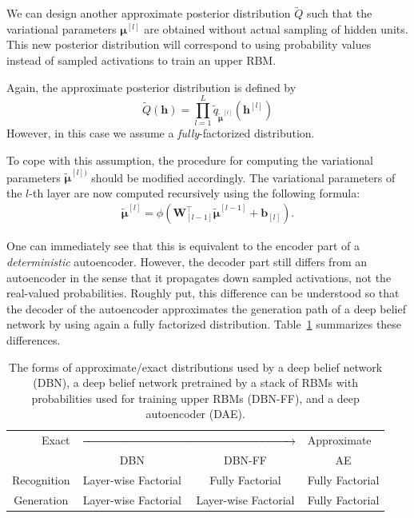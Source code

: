 \documentclass[dissertation,nocontribution,draft*]{aaltoseries}
\newcommand{\qlay}[1]{\left[#1\right]}
\newcommand{\vect}[1]{\mathbf{#1}}
\newcommand{\vects}[1]{\boldsymbol{#1}}
\newcommand{\matr}[1]{\mathbf{#1}}
\newcommand{\vb}[0]{\vect{b}}
\newcommand{\vh}[0]{\vect{h}}
\newcommand{\mW}[0]{\matr{W}}
\newcommand{\vmu}[0]{\vects{\mu}}
\begin{document}
We can design another approximate posterior distribution
$\tilde{Q}$ such that the variational parameters
$\vmu^{\qlay{l}}$ are obtained without actual sampling of hidden
units. This new posterior distribution will correspond to
using probability values instead of sampled activations to
train an upper RBM.

Again, the approximate posterior distribution is defined by
\[
\tilde{Q}(\vh) = \prod_{l=1}^L \tilde{q}_{\tilde{\vmu}^{\qlay{l}}}\left(
\vh^{\qlay{l}} \right)
\]
However, in this case we assume a \textit{fully}-factorized
distribution. 

To cope with this assumption, the procedure for computing
the variational parameters $\tilde{\vmu}^{\qlay{l})}$ should
be modified accordingly.  The variational parameters of the
$l$-th layer are now computed recursively using the
following formula: 
\begin{align}
    \label{eq:dbn_posterior_ff}
    \tilde{\vmu}^{\qlay{l}} = \phi\left( \mW_{\qlay{l-1}}^\top
    \tilde{\vmu}^{\qlay{l-1}} + \vb_{\qlay{l}} \right).
\end{align}

One can immediately see that this is equivalent to the
encoder part of a \textit{deterministic} autoencoder.
However, the decoder part still differs from an autoencoder
in the sense that it propagates down sampled activations,
not the real-valued probabilities.  Roughly put, this
difference can be understood so that the decoder of the
autoencoder approximates the generation path of a deep
belief network by using again a fully factorized distribution.
Table~\ref{tbl:dbn_ae} summarizes these differences.

\begin{table}[h]
\vskip 0.15in
    \centering
    \begin{tabular}{c || c | c | c}
        \multicolumn{1}{r}{Exact}&
        \multicolumn{2}{c}{$\xrightarrow{\hspace{6.5cm}}$} 
        & \multicolumn{1}{l}{Approximate} \\
        & DBN & DBN-FF & AE \\
        \hline
        \hline
        Recognition & Layer-wise Factorial & Fully Factorial & Fully Factorial \\
        \hline
        Generation & Layer-wise Factorial & Layer-wise Factorial & Fully Factorial \\
    \end{tabular}
    \caption{The forms of approximate/exact 
    distributions used by a deep belief network (DBN), a
    deep belief network pretrained by a stack of RBMs with
    probabilities used for training upper RBMs (DBN-FF), and
    a deep autoencoder (DAE).}
    \label{tbl:dbn_ae}
\end{table}
\end{document}
